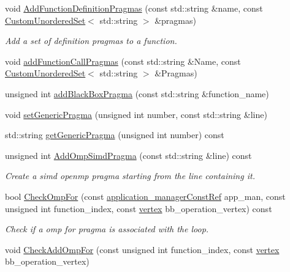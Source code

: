 \begin{DoxyCompactItemize}
void \hyperlink{classpragma__manager_a8ae9fe4e390d2823fc713a6a4219edf0}{Add\+Function\+Definition\+Pragmas} (const std\+::string \&name, const \hyperlink{classCustomUnorderedSet}{Custom\+Unordered\+Set}$<$ std\+::string $>$ \&pragmas)
\begin{DoxyCompactList}\small\item\em Add a set of definition pragmas to a function. \end{DoxyCompactList}\item 
void \hyperlink{classpragma__manager_a420b9692559523899f4af05afed3fd15}{add\+Function\+Call\+Pragmas} (const std\+::string \&Name, const \hyperlink{classCustomUnorderedSet}{Custom\+Unordered\+Set}$<$ std\+::string $>$ \&Pragmas)
\item 
unsigned int \hyperlink{classpragma__manager_a5f0bcf90f2232b3dcff39dc3daa5d3b6}{add\+Black\+Box\+Pragma} (const std\+::string \&function\+\_\+name)
\item 
void \hyperlink{classpragma__manager_a5019e9a4c8938b27b6f3cfe2f597542a}{set\+Generic\+Pragma} (unsigned int number, const std\+::string \&line)
\item 
std\+::string \hyperlink{classpragma__manager_aa6718e446348d945f4b2ae1ff05202ee}{get\+Generic\+Pragma} (unsigned int number) const
\item 
unsigned int \hyperlink{classpragma__manager_ad0fd54d0ee85c926008a7c0ed76dfaa3}{Add\+Omp\+Simd\+Pragma} (const std\+::string \&line) const
\begin{DoxyCompactList}\small\item\em Create a simd openmp pragma starting from the line containing it. \end{DoxyCompactList}\item 
bool \hyperlink{classpragma__manager_ab11210292e6fd579b9d7e329a0de1bab}{Check\+Omp\+For} (const \hyperlink{application__manager_8hpp_abb985163a2a3fb747f6f03b1eaadbb44}{application\+\_\+manager\+Const\+Ref} app\+\_\+man, const unsigned int function\+\_\+index, const \hyperlink{graph_8hpp_abefdcf0544e601805af44eca032cca14}{vertex} bb\+\_\+operation\+\_\+vertex) const
\begin{DoxyCompactList}\small\item\em Check if a omp for pragma is associated with the loop. \end{DoxyCompactList}\item 
void \hyperlink{classpragma__manager_a4d74b44eafacef0dd1b64d29f941e692}{Check\+Add\+Omp\+For} (const unsigned int function\+\_\+index, const \hyperlink{graph_8hpp_abefdcf0544e601805af44eca032cca14}{vertex} bb\+\_\+operation\+\_\+vertex)

\end{DoxyCompactItemize}

